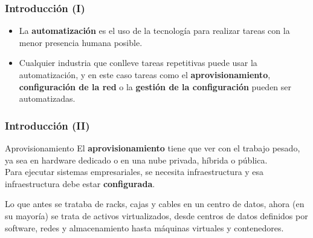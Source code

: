 \documentclass[
	11pt, %
]{beamer}
\begin{document}

\begin{frame}
	\frametitle{Introducción (I)}

    \begin{itemize}
        \item La \textbf{automatización} es el uso de la tecnología para realizar tareas con la menor presencia humana posible.
        \item Cualquier industria que conlleve tareas repetitivas puede usar la automatización, y en este caso tareas como el \textbf{aprovisionamiento}, \textbf{configuración de la red} o la \textbf{gestión de la configuración} pueden ser automatizadas. \cite{p1}
        
    \end{itemize}

\end{frame}


\begin{frame}
	\frametitle{Introducción (II)}

        \begin{block}{Aprovisionamiento}
            El \textbf{aprovisionamiento} tiene que ver con el trabajo pesado, ya sea en hardware dedicado o en una nube privada, híbrida o pública.\\
            Para ejecutar sistemas empresariales, se necesita infraestructura y esa infraestructura debe estar \textbf{configurada}.
        \end{block}
        \begin{block}{}
            Lo que antes se trataba de racks, cajas y cables en un centro de datos, ahora (en su mayoría) se trata de activos virtualizados, desde centros de datos definidos por software, redes y almacenamiento hasta máquinas virtuales y contenedores. \cite{p1}
        \end{block}

\end{frame}

\end{document}
